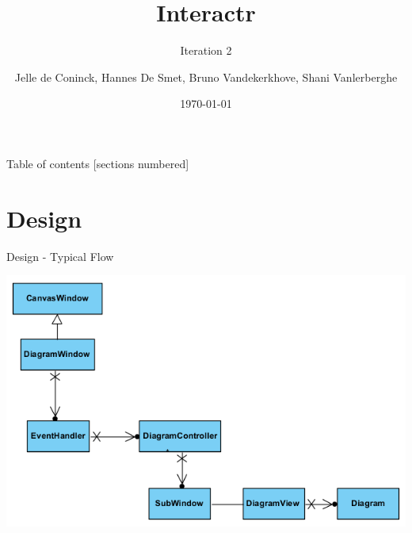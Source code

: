 \documentclass[10pt]{beamer}
\title{Interactr}
\subtitle{Iteration 2}
\date{\today}
\author{Jelle de Coninck, Hannes De Smet, Bruno Vandekerkhove, Shani Vanlerberghe}
\institute{KULeuven}
\begin{document}
\maketitle

\begin{frame}{Table of contents}
  [sections numbered]
  \tableofcontents[hideallsubsections]
\end{frame}

\section{Design}

\begin{frame}[fragile]{Design - Typical Flow}
\begin{center}
\includegraphics[width=1\textwidth]{flow}
\end{center}
\end{frame}
\end{document}
